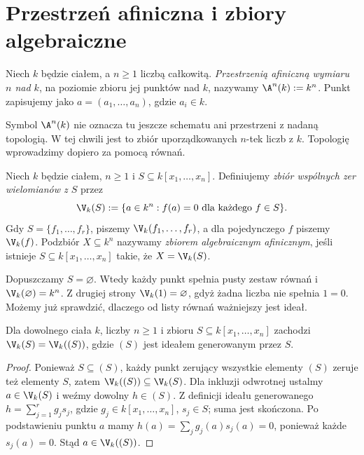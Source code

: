 \section{Przestrzeń afiniczna i zbiory algebraiczne}

\begin{definicja}
Niech $k$ będzie ciałem, a $n\ge1$ liczbą całkowitą. \emph{Przestrzenią
afiniczną wymiaru $n$ nad $k$}, na poziomie zbioru jej punktów nad $k$,
nazywamy $\A^n(k):=k^n$. Punkt zapisujemy jako
$a=(a_1,\dots,a_n)$, gdzie $a_i\in k$.
\end{definicja}

Symbol $\A^n(k)$ nie oznacza tu jeszcze schematu ani przestrzeni z nadaną
topologią. W tej chwili jest to zbiór uporządkowanych $n$-tek liczb z $k$.
Topologię wprowadzimy dopiero za pomocą równań.

\begin{definicja}
Niech $k$ będzie ciałem, $n\ge1$ i $S\subseteq k[x_1,\dots,x_n]$.
Definiujemy \emph{zbiór wspólnych zer wielomianów z $S$} przez
\[
\V_k(S):=\{a\in k^n: f(a)=0\text{ dla każdego }f\in S\}.
\]
Gdy $S=\{f_1,\dots,f_r\}$, piszemy
$\V_k(f_1,\dots,f_r)$, a dla pojedynczego $f$ piszemy $\V_k(f)$.
Podzbiór $X\subseteq k^n$ nazywamy \emph{zbiorem algebraicznym afinicznym},
jeśli istnieje $S\subseteq k[x_1,\dots,x_n]$ takie, że $X=\V_k(S)$.
\end{definicja}

Dopuszczamy $S=\varnothing$. Wtedy każdy punkt spełnia pusty zestaw
równań i $\V_k(\varnothing)=k^n$. Z drugiej strony
$\V_k(1)=\varnothing$, gdyż żadna liczba nie spełnia $1=0$.
Możemy już sprawdzić, dlaczego od listy równań ważniejszy jest ideał.

\begin{stwierdzenie}
\label{st:V-ideal}
Dla dowolnego ciała $k$, liczby $n\ge1$ i zbioru
$S\subseteq k[x_1,\dots,x_n]$ zachodzi $\V_k(S)=\V_k((S))$,
gdzie $(S)$ jest ideałem generowanym przez $S$.
\end{stwierdzenie}
\begin{proof}
Ponieważ $S\subseteq(S)$, każdy punkt zerujący wszystkie elementy
$(S)$ zeruje też elementy $S$, zatem $\V_k((S))\subseteq\V_k(S)$.
Dla inkluzji odwrotnej ustalmy $a\in\V_k(S)$ i weźmy dowolny
$h\in(S)$. Z definicji ideału generowanego
$h=\sum_{j=1}^r g_js_j$, gdzie $g_j\in k[x_1,\dots,x_n]$,
$s_j\in S$; suma jest skończona. Po podstawieniu punktu $a$ mamy
$h(a)=\sum_jg_j(a)s_j(a)=0$, ponieważ każde $s_j(a)=0$.
Stąd $a\in\V_k((S))$.
\end{proof}

